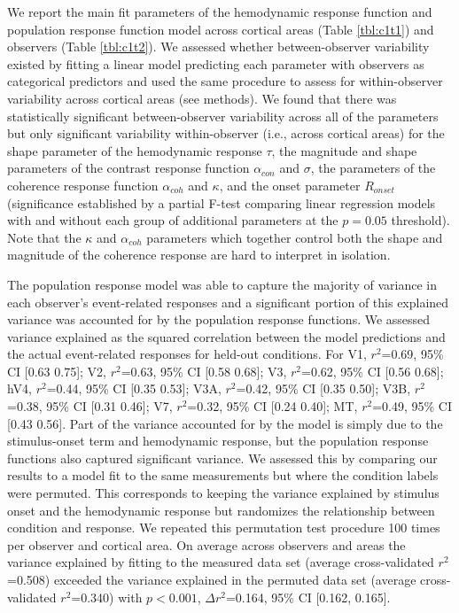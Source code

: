 We report the main fit parameters of the hemodynamic response function and population response function model across cortical areas (Table \ref{tbl:c1t1}) and observers (Table \ref{tbl:c1t2}). We assessed whether between-observer variability existed by fitting a linear model predicting each parameter with observers as categorical predictors and used the same procedure to assess for within-observer variability across cortical areas (see methods). We found that there was statistically significant between-observer variability across all of the parameters but only significant variability within-observer (i.e., across cortical areas) for the shape parameter of the hemodynamic response $\tau$, the magnitude and shape parameters of the contrast response function $\alpha_{con}$ and $\sigma$, the parameters of the coherence response function $\alpha_{coh}$ and $\kappa$, and the onset parameter $R_{onset}$ (significance established by a partial F-test comparing linear regression models with and without each group of additional parameters at the $p = 0.05$ threshold). Note that the $\kappa$ and $\alpha_{coh}$ parameters which together control both the shape and magnitude of the coherence response are hard to interpret in isolation.









The population response model was able to capture the majority of variance in each observer’s event-related responses and a significant portion of this explained variance was accounted for by the population response functions. We assessed variance explained as the squared correlation between the model predictions and the actual event-related responses for held-out conditions. For V1, $r^2$=0.69, 95\% CI [0.63 0.75]; V2, $r^2$=0.63, 95\% CI [0.58 0.68]; V3, $r^2$=0.62, 95\% CI [0.56 0.68]; hV4, $r^2$=0.44, 95\% CI [0.35 0.53]; V3A, $r^2$=0.42, 95\% CI [0.35 0.50]; V3B, $r^2$=0.38, 95\% CI [0.31 0.46]; V7, $r^2$=0.32, 95\% CI [0.24 0.40]; MT, $r^2$=0.49, 95\% CI [0.43 0.56]. Part of the variance accounted for by the model is simply due to the stimulus-onset term and hemodynamic response, but the population response functions also captured significant variance. We assessed this by comparing our results to a model fit to the same measurements but where the condition labels were permuted. This corresponds to keeping the variance explained by stimulus onset and the hemodynamic response but randomizes the relationship between condition and response. We repeated this permutation test procedure 100 times per observer and cortical area. On average across observers and areas the variance explained by fitting to the measured data set (average cross-validated $r^2$=0.508) exceeded the variance explained in the permuted data set (average cross-validated $r^2$=0.340) with $p < 0.001$, $\Delta r^2$=0.164, 95\% CI [0.162, 0.165].

